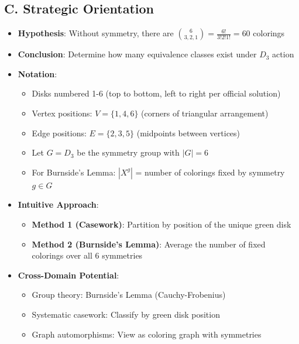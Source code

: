 \documentclass[11pt]{article}
\begin{document}
\begin{problemconfigbox}
\subsection*{C. Strategic Orientation}
\begin{itemize}[leftmargin=*]
    \item \textbf{Hypothesis}: Without symmetry, there are $\binom{6}{3,2,1} = \frac{6!}{3!2!1!} = 60$ colorings
    \item \textbf{Conclusion}: Determine how many equivalence classes exist under $D_3$ action
    \item \textbf{Notation}: 
    \begin{itemize}
        \item Disks numbered 1-6 (top to bottom, left to right per official solution)
        \item Vertex positions: $V = \{1, 4, 6\}$ (corners of triangular arrangement)
        \item Edge positions: $E = \{2, 3, 5\}$ (midpoints between vertices)
        \item Let $G = D_3$ be the symmetry group with $|G| = 6$
        \item For Burnside's Lemma: $|X^g|$ = number of colorings fixed by symmetry $g \in G$
    \end{itemize}
    \item \textbf{Intuitive Approach}: 
    \begin{itemize}
        \item \textbf{Method 1 (Casework)}: Partition by position of the unique green disk
        \item \textbf{Method 2 (Burnside's Lemma)}: Average the number of fixed colorings over all 6 symmetries
    \end{itemize}
    \item \textbf{Cross-Domain Potential}: 
    \begin{itemize}
        \item Group theory: Burnside's Lemma (Cauchy-Frobenius)
        \item Systematic casework: Classify by green disk position
        \item Graph automorphisms: View as coloring graph with symmetries
    \end{itemize}
\end{itemize}
\end{problemconfigbox}
\end{document}
